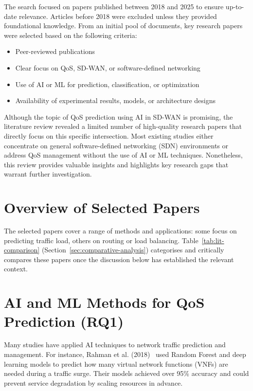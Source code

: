 \documentclass[a4paper,12pt]{Classes/RoboticsLaTeX}
\begin{document}
The search focused on papers published between 2018 and 2025 to ensure up-to-date relevance. Articles before 2018 were excluded unless they provided foundational knowledge. From an initial pool of documents, key research papers were selected based on the following criteria:
\begin{itemize}
    \item Peer-reviewed publications
    \item Clear focus on QoS, SD-WAN, or software-defined networking
    \item Use of AI or ML for prediction, classification, or optimization
    \item Availability of experimental results, models, or architecture designs
\end{itemize}

Although the topic of QoS prediction using AI in SD-WAN is promising, the literature review revealed a limited number of high-quality research papers that directly focus on this specific intersection. Most existing studies either concentrate on general software-defined networking (SDN) environments or address QoS management without the use of AI or ML techniques. Nonetheless, this review provides valuable insights and highlights key research gaps that warrant further investigation.
\section{Overview of Selected Papers}

The selected papers cover a range of methods and applications: some focus on predicting traffic load, others on routing or load balancing. Table~\ref{tab:lit-comparison} (Section~\ref{sec:comparative-analysis}) categorises and critically compares these papers once the discussion below has established the relevant context.

\section{AI and ML Methods for QoS Prediction (RQ1)}

Many studies have applied AI techniques to network traffic prediction and management. For instance, Rahman et al. (2018)~\cite{rahman2019autoscaling} used Random Forest and deep learning models to predict how many virtual network functions (VNFs) are needed during a traffic surge. Their models achieved over 95\% accuracy and could prevent service degradation by scaling resources in advance.
\end{document}
